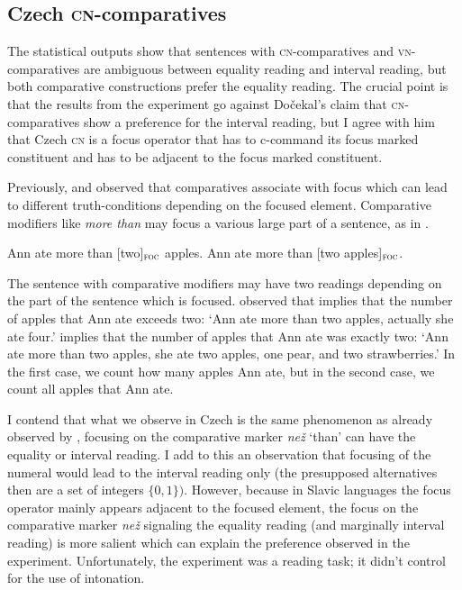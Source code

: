 \documentclass[output=paper,
]{langscibook}
\begin{document}
\subsection{Czech \textsc{cn-}comparatives}\label{sect:ccn}

The statistical outputs show that sentences with \textsc{cn-}comparatives and \textsc{vn-}com\-pa\-ra\-tives are ambiguous between equality reading and interval reading, but both comparative constructions prefer the equality reading. The crucial point is that the results from the experiment go against Dočekal's claim that \textsc{cn-}comparatives show a preference for the interval reading, but I agree with him that Czech \textsc{cn} is a focus operator that has to c-command its focus marked constituent and has to be adjacent to the focus marked constituent.

Previously, \citet{cohen2014superlative} and \citet{geurts2007least} observed that comparatives associate with focus which can lead to different truth-conditions depending on the focused element. Comparative modifiers like \textit{more than} may focus a various large part of a sentence, as in .

\ea \label{ex:apples} 
\ea Ann ate more than [two]$_{\textsc{foc}}$ apples. \label{ex:apples_int}
\ex Ann ate more than [two apples]$_{\textsc{foc}}$. \label{ex:apples_exh}
\z
\z

\noindent The sentence with comparative modifiers may have two readings depending on the part of the sentence which is focused. \citet{geurts2007least} observed that  implies that the number of apples that Ann ate exceeds two:  `Ann ate more than two apples, actually she ate four.'  implies that the number of apples that Ann ate was exactly two: `Ann ate more than two apples, she ate two apples, one pear, and two strawberries.' In the first case, we count how many apples Ann ate, but in the second case, we count all apples that Ann ate. 

I contend that what we observe in Czech is the same phenomenon as already observed by \cite{dovcekal2017upper}, focusing on the comparative marker \textit{než} `than' can have the equality or interval reading. I add to this an observation that focusing of the numeral would lead to the interval reading only (the presupposed alternatives then are a set of integers $\{0,1\})$. However, because in Slavic languages the focus operator mainly appears adjacent to the focused element, the focus on the comparative marker \textit{než} signaling the equality reading (and marginally interval reading) is more salient which can explain the preference observed in the experiment. Unfortunately, the experiment was a reading task; it didn't control for the use of intonation.
\end{document}
